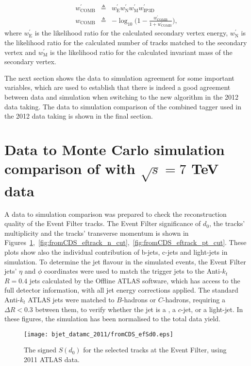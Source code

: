 \begin{eqnarray}
\displaystyle
w^\prime_{\textrm{COMB}} &\triangleq& w^\prime_{\textrm{E}} w^\prime_{\textrm{N}} w^\prime_{\textrm{M}} w^\prime_{\textrm{IP3D}} \nonumber \\
w_{\textrm{COMB}} &\triangleq& - \log_{10} \Big( 1 - \frac{w^\prime_{\textrm{COMB}}}{1+ w^\prime_{\textrm{COMB}}} \Big),
\label{eq:comb}
\end{eqnarray}
where $w^\prime_{\textrm{E}}$ is the likelihood ratio for the calculated secondary vertex energy, $w^\prime_{\textrm{N}}$ is the likelihood ratio for the
calculated number of tracks matched to the secondary vertex and $w^\prime_{\textrm{M}}$ is the likelihood ratio for the calculated invariant mass of
the secondary vertex.


The next section shows the
data to simulation agreement for some important variables, which are used to establish that there is indeed
a good agreement between data and simulation when switching to the new algorithm in the 2012 data taking.
The data to simulation comparison of the combined tagger used in the 2012 data taking is shown in the final section.

\section{Data to Monte Carlo simulation comparison of with $\sqrt{s} = 7$ TeV data}

A data to simulation comparison was prepared to check the reconstruction quality of the
Event Filter tracks.
The Event Filter significance of $d_0$, the tracks' multiplicity and the tracks' transverse momentum
is shown in Figures~\ref{fig:fromCDS_efSd0},~\ref{fig:fromCDS_eftrack_n_cut},~\ref{fig:fromCDS_eftrack_pt_cut}.
These plots show also the individual contribution of b-jets, c-jets and light-jets in simulation.
To determine the jet flavour in the simulated events, the Event Filter jets' $\eta$ and $\phi$ coordinates were used to match the trigger jets to the Anti-$k_t$ $R=0.4$
jets calculated by the Offline ATLAS software, which has access to the full detector information, with all jet energy corrections
applied. The standard Anti-$k_t$ ATLAS jets were matched to $B$-hadrons or $C$-hadrons, requiring a $\Delta R < 0.3$ between them,
to verify whether the jet is a \bjet, a $c$-jet, or a light-jet. In these figures, the simulation has been normalised to the total data yield.

\begin{figure}[H]
\centering
\texttt{[image: bjet\_datamc\_2011/fromCDS\_efSd0.eps]}
\caption{The signed $S(d_0)$ for the selected tracks at the Event Filter, using 2011 ATLAS data.}
\label{fig:fromCDS_efSd0}
\end{figure}

